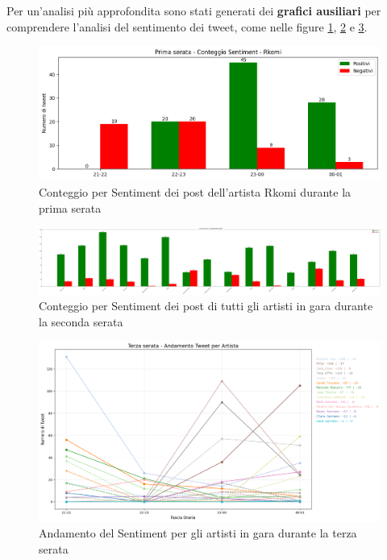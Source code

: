 \documentclass[a4paper,12pt]{article}
\begin{document}
Per un'analisi più approfondita sono stati generati dei \textbf{grafici ausiliari} per comprendere l'analisi del sentimento dei tweet, come nelle figure \ref{fig:conteggio-sentiment-per-artista}, \ref{fig:conteggio-sentiment-per-serata} e \ref{fig:andamento-sentiment-per-serata}.

\begin{figure}[H]
    \centering
    \includegraphics[width=0.8\linewidth]{media/conteggio-sentiment.png}
    \caption{Conteggio per Sentiment dei post dell'artista Rkomi durante la prima serata}
    \label{fig:conteggio-sentiment-per-artista}
\end{figure}

\begin{figure}[H]
    \centering
    \includegraphics[width=\linewidth]{media/conteggio tweet per serata.png}
    \caption{Conteggio per Sentiment dei post di tutti gli artisti in gara durante la seconda serata}
    \label{fig:conteggio-sentiment-per-serata}
\end{figure}

\begin{figure}[H]
    \centering
    \includegraphics[width=1.2\linewidth]{media/andamento-tweet.png}
    \caption{Andamento del Sentiment per gli artisti in gara durante la terza serata}
    \label{fig:andamento-sentiment-per-serata}
\end{figure}
\end{document}
